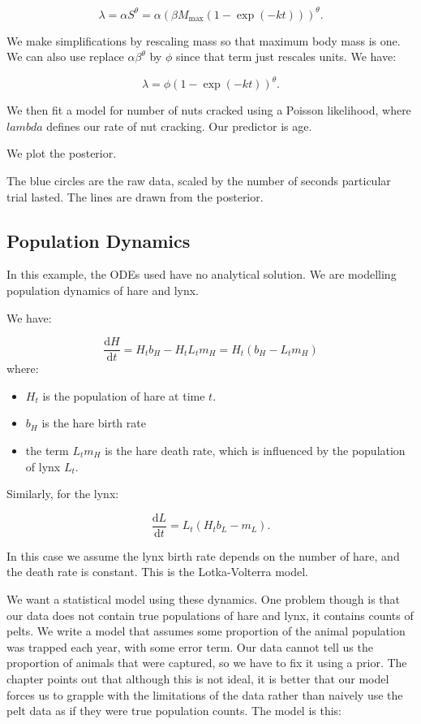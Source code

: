 \documentclass[
]{book}
\providecommand{\tightlist}{%
  \setlength{\itemsep}{0pt}\setlength{\parskip}{0pt}}
\begin{document}
\[
\lambda = \alpha S^\theta = \alpha (\beta M_\text{max}(1- \exp(-kt)))^\theta.
\]

We make simplifications by rescaling mass so that maximum body mass is one. We can also use replace \(\alpha \beta^\theta\) by \(\phi\) since that term just rescales units. We have:

\[
\lambda = \phi (1- \exp(-kt))^\theta.
\]

We then fit a model for number of nuts cracked using a Poisson likelihood, where \(lambda\) defines our rate of nut cracking. Our predictor is age.

We plot the posterior.

The blue circles are the raw data, scaled by the number of seconds particular trial lasted. The lines are drawn from the posterior.

\hypertarget{population-dynamics}{%
\subsection*{Population Dynamics}\label{population-dynamics}}

In this example, the ODEs used have no analytical solution. We are modelling population dynamics of hare and lynx.

We have:

\[
\frac{\text{d}H}{\text{d}t} = H_t b_H - H_t L_t m_H = H_t (b_H - L_t m_H)
\]
where:

\begin{itemize}
\tightlist
\item
  \(H_t\) is the population of hare at time \(t\).
\item
  \(b_H\) is the hare birth rate
\item
  the term \(L_t m_H\) is the hare death rate, which is influenced by the population of lynx \(L_t\).
\end{itemize}

Similarly, for the lynx:

\[
\frac{\text{d}L}{\text{d}t} = L_t (H_t b_L - m_L).
\]

In this case we assume the lynx birth rate depends on the number of hare, and the death rate is constant. This is the Lotka-Volterra model.

We want a statistical model using these dynamics. One problem though is that our data does not contain true populations of hare and lynx, it contains counts of pelts. We write a model that assumes some proportion of the animal population was trapped each year, with some error term. Our data cannot tell us the proportion of animals that were captured, so we have to fix it using a prior. The chapter points out that although this is not ideal, it is better that our model forces us to grapple with the limitations of the data rather than naively use the pelt data as if they were true population counts. The model is this:
\end{document}

